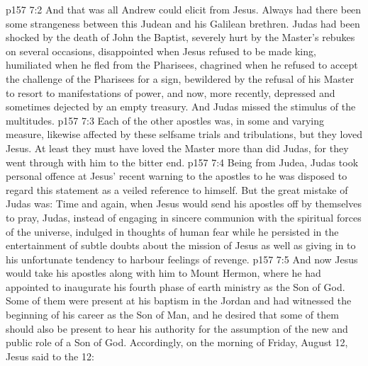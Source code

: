 \vs p157 7:2 And that was all Andrew could elicit from Jesus. Always had there been some strangeness between this Judean and his Galilean brethren. Judas had been shocked by the death of John the Baptist, severely hurt by the Master’s rebukes on several occasions, disappointed when Jesus refused to be made king, humiliated when he fled from the Pharisees, chagrined when he refused to accept the challenge of the Pharisees for a sign, bewildered by the refusal of his Master to resort to manifestations of power, and now, more recently, depressed and sometimes dejected by an empty treasury. And Judas missed the stimulus of the multitudes.
\vs p157 7:3 Each of the other apostles was, in some and varying measure, likewise affected by these selfsame trials and tribulations, but they loved Jesus. At least they must have loved the Master more than did Judas, for they went through with him to the bitter end.
\vs p157 7:4 Being from Judea, Judas took personal offence at Jesus’ recent warning to the apostles to  he was disposed to regard this statement as a veiled reference to himself. But the great mistake of Judas was: Time and again, when Jesus would send his apostles off by themselves to pray, Judas, instead of engaging in sincere communion with the spiritual forces of the universe, indulged in thoughts of human fear while he persisted in the entertainment of subtle doubts about the mission of Jesus as well as giving in to his unfortunate tendency to harbour feelings of revenge.
\vs p157 7:5 \pc And now Jesus would take his apostles along with him to Mount Hermon, where he had appointed to inaugurate his fourth phase of earth ministry as the Son of God. Some of them were present at his baptism in the Jordan and had witnessed the beginning of his career as the Son of Man, and he desired that some of them should also be present to hear his authority for the assumption of the new and public role of a Son of God. Accordingly, on the morning of Friday, August 12, Jesus said to the 12: 
\quizlink
